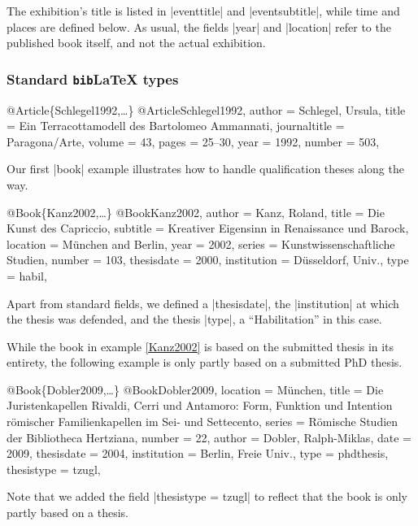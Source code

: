 \documentclass[a4paper,
10pt,
ngerman,
english
]{ltxdoc}
\begin{document}
The exhibition's title is listed in |eventtitle| and |eventsubtitle|, while time and places are defined below. As usual, the fields |year| and |location| refer to the published book itself, and not the actual exhibition.

\subsubsection{Standard \texttt{bib}\LaTeX{} types}

\begin{bibexample}[label=Schlegel1992]{{@}Article\{Schlegel1992,…\}}
@Article{Schlegel1992,
  author       = {Schlegel, Ursula},
  title        = {Ein Terracottamodell des Bartolomeo Ammannati},
  journaltitle = {Paragona/Arte},
  volume       = {43},
  pages        = {25--30},
  year         = {1992},
  number       = {503},
}
\end{bibexample}

Our first |book| example illustrates how to handle qualification theses along the way.
\begin{bibexample}[label=Kanz2002]{{@}Book\{Kanz2002,…\}}
@Book{Kanz2002,
  author      = {Kanz, Roland},
  title       = {Die Kunst des Capriccio},
  subtitle    = {Kreativer Eigensinn in Renaissance und Barock},
  location    = {München and Berlin},
  year        = {2002},
  series      = {Kunstwissenschaftliche Studien},
  number      = {103},
  thesisdate  = {2000},
  institution = {Düsseldorf, Univ.},
  type        = {habil},
}
\end{bibexample}
Apart from standard fields, we defined a |thesisdate|, the |institution| at which the thesis was defended, and the thesis |type|, a \foreignquote{german}{Habilitation} in this case.

While the book in example \ref{Kanz2002} is based on the submitted thesis in its entirety, the following example is only partly based on a submitted PhD thesis.
\begin{bibexample}[label=Dobler2009]{{@}Book\{Dobler2009,…\}}
@Book{Dobler2009,
  location = {München},
  title = {Die Juristenkapellen Rivaldi, Cerri und Antamoro: Form, Funktion und Intention römischer Familienkapellen im Sei- und Settecento},
  series = {Römische Studien der Bibliotheca Hertziana},
  number = {22},
  author = {Dobler, Ralph-Miklas},
  date = {2009},
  thesisdate = {2004},
  institution = {Berlin, Freie Univ.},
  type = {phdthesis},
  thesistype = {tzugl},
}
\end{bibexample}
Note that we added the field |thesistype = {tzugl}| to reflect that the book is only partly based on a thesis.
\end{document}
